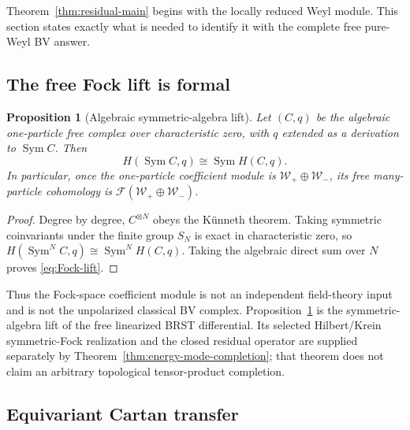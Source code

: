 \documentclass[11pt]{article}
\newtheorem{proposition}[theorem]{Proposition}
\theoremstyle{definition}
\theoremstyle{remark}
\newcommand{\W}{\mathcal W}
\newcommand{\F}{\mathcal F}
\begin{document}
Theorem~\ref{thm:residual-main} begins with the locally reduced Weyl module.
This section states exactly what is needed to identify it with the complete
free pure-Weyl BV answer.

\subsection{The free Fock lift is formal}

\begin{proposition}[Algebraic symmetric-algebra lift]
\label{prop:Fock-lift}
Let $(C,q)$ be the algebraic one-particle free complex over characteristic
zero, with $q$ extended as a derivation to $\operatorname{Sym}C$.  Then
\begin{equation}\label{eq:Fock-lift}
 \boxed{
 H(\operatorname{Sym}C,q)
 \cong\operatorname{Sym}H(C,q).}
\end{equation}
In particular, once the one-particle coefficient module is
$\W_+\oplus\W_-$, its free many-particle cohomology is
$\F(\W_+\oplus\W_-)$.
\end{proposition}

\begin{proof}
Degree by degree, $C^{\otimes N}$ obeys the K\"unneth theorem.  Taking
symmetric coinvariants under the finite group $S_N$ is exact in
characteristic zero, so
$H(\operatorname{Sym}^NC,q)\cong\operatorname{Sym}^NH(C,q)$.  Taking the
algebraic direct sum over $N$ proves \eqref{eq:Fock-lift}.
\end{proof}

Thus the Fock-space coefficient module is not an independent field-theory
input and is not the unpolarized classical BV complex.
Proposition~\ref{prop:Fock-lift} is the symmetric-algebra lift of the free
linearized BRST differential.  Its selected
Hilbert/Krein symmetric-Fock realization and the closed residual operator
are supplied separately by Theorem~\ref{thm:energy-mode-completion}; that
theorem does not claim an arbitrary topological tensor-product completion.

\subsection{Equivariant Cartan transfer}
\end{document}
